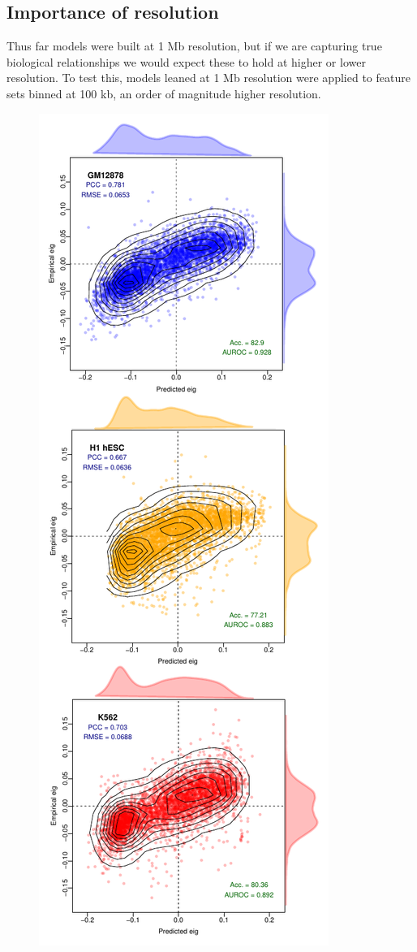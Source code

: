\documentclass[a4paper,11pt,oneside]{book}
\begin{document}

\subsection{Importance of resolution}

Thus far models were built at 1 Mb resolution, but if we are capturing true biological relationships we would expect these to hold at higher or lower resolution. To test this, models leaned at 1 Mb resolution were applied to feature sets binned at 100 kb, an order of magnitude higher resolution.

\begin{figure}
\begin{center} 
\includegraphics[width=.6\textwidth]{figs/100kb.pdf}

\end{center}
\end{figure}
\end{document}
